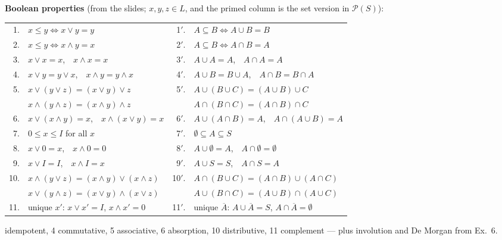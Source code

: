 \documentclass{fkt-notes}
\theoremstyle{definition}
\begin{document}
\noindent\textbf{Boolean properties} (from the slides; $x,y,z\in L$, and
the primed column is the set version in $\mathcal P(S)$):\\[3pt]
\begin{rulepar}
  {\small
    \begin{tabular}{@{}r@{\ }l@{\qquad}r@{\ }l@{}}
      \toprule
      1.  & $x\le y\iff x\vee y=y$                        & 1$'$.  & $A\subseteq B\iff A\cup B=B$                                             \\
      2.  & $x\le y\iff x\wedge y=x$                      & 2$'$.  & $A\subseteq B\iff A\cap B=A$                                             \\
      3.  & $x\vee x=x$,\ \ $x\wedge x=x$                 & 3$'$.  & $A\cup A=A$,\ \ $A\cap A=A$                                              \\
      4.  & $x\vee y=y\vee x$,\ \ $x\wedge y=y\wedge x$   & 4$'$.  & $A\cup B=B\cup A$,\ \ $A\cap B=B\cap A$                                  \\
      5.  & $x\vee(y\vee z)=(x\vee y)\vee z$              & 5$'$.  & $A\cup(B\cup C)=(A\cup B)\cup C$                                         \\
          & $x\wedge(y\wedge z)=(x\wedge y)\wedge z$      &        & $A\cap(B\cap C)=(A\cap B)\cap C$                                         \\
      6.  & $x\vee(x\wedge y)=x$,\ \ $x\wedge(x\vee y)=x$ & 6$'$.  & $A\cup(A\cap B)=A$,\ \ $A\cap(A\cup B)=A$                                \\
      7.  & $0\le x\le I$ for all $x$                     & 7$'$.  & $\emptyset\subseteq A\subseteq S$                                        \\
      8.  & $x\vee0=x$,\ \ $x\wedge0=0$                   & 8$'$.  & $A\cup\emptyset=A$,\ \ $A\cap\emptyset=\emptyset$                        \\
      9.  & $x\vee I=I$,\ \ $x\wedge I=x$                 & 9$'$.  & $A\cup S=S$,\ \ $A\cap S=A$                                              \\
      10. & $x\wedge(y\vee z)=(x\wedge y)\vee(x\wedge z)$ & 10$'$. & $A\cap(B\cup C)=(A\cap B)\cup(A\cap C)$                                  \\
          & $x\vee(y\wedge z)=(x\vee y)\wedge(x\vee z)$   &        & $A\cup(B\cap C)=(A\cup B)\cap(A\cup C)$                                  \\
      11. & unique $x'$: $x\vee x'=I$, $x\wedge x'=0$     & 11$'$. & unique $\overline A$: $A\cup\overline A=S$, $A\cap\overline A=\emptyset$ \\
      \bottomrule
    \end{tabular}}

  \medskip
   idempotent, 4 commutative, 5 associative, 6 absorption,
  10 distributive, 11 complement --- plus involution and De Morgan from
  Ex.~6.
\end{rulepar}
\end{document}
